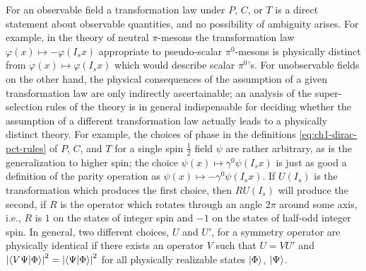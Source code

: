 For an observable field a transformation law under $P$, $C$, or $T$ is a
direct statement about observable quantities, and no possibility of ambiguity
arises.  For example, in the theory of neutral $\pi$-mesons the transformation
law $\varphi(x)\mapsto-\varphi(I_sx)$ appropriate to pseudo-scalar
$\pi^0$-mesons is physically distinct from
$\varphi(x)\mapsto\varphi(I_sx)$ which would describe scalar $\pi^0$'s.  For
unobservable fields on the other hand, the physical consequences of the
assumption of a given transformation law are only indirectly ascertainable;
an analysis of the super-selection rules of the theory is in general
indispensable for deciding whether the assumption of a different
transformation law actually leads to a physically distinct theory.  For
example, the choices of phase in the definitions \eqref{eq:ch1-dirac-pct-rules} of $P$, $C$, and $T$
for a single spin $\tfrac12$ field $\psi$ are rather arbitrary, as is the
generalization to higher spin; the choice $\psi(x)\mapsto\gamma^0\psi(I_sx)$
is just as good a definition of the parity operation as
$\psi(x)\mapsto-\gamma^0\psi(I_sx)$.  If $U(I_s)$ is the transformation which
produces the first choice, then $RU(I_s)$ will produce the second, if $R$ is
the operator which rotates through an angle $2\pi$ around some axis, i.e., $R$
is $1$ on the states of integer spin and $-1$ on the states of half-odd
integer spin.  In general, two
different choices, $U$ and $U'$, for a symmetry operator are physically
identical if there exists an operator $V$ such that $U=VU'$ and
$\left|\langle V\Psi\vert \Phi\rangle\right|^2=\left|\langle \Psi\vert \Phi\rangle\right|^2$
for all physically realizable states $\lvert \Phi\rangle$, $\lvert \Psi\rangle$.

